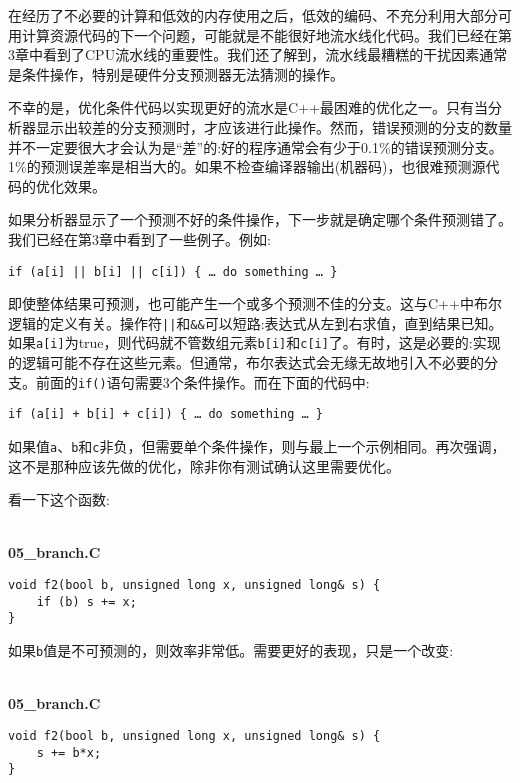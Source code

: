 在经历了不必要的计算和低效的内存使用之后，低效的编码、不充分利用大部分可用计算资源代码的下一个问题，可能就是不能很好地流水线化代码。我们已经在第3章中看到了CPU流水线的重要性。我们还了解到，流水线最糟糕的干扰因素通常是条件操作，特别是硬件分支预测器无法猜测的操作。 

不幸的是，优化条件代码以实现更好的流水是C++最困难的优化之一。只有当分析器显示出较差的分支预测时，才应该进行此操作。然而，错误预测的分支的数量并不一定要很大才会认为是“差”的:好的程序通常会有少于0.1\%的错误预测分支。1\%的预测误差率是相当大的。如果不检查编译器输出(机器码)，也很难预测源代码的优化效果。

如果分析器显示了一个预测不好的条件操作，下一步就是确定哪个条件预测错了。我们已经在第3章中看到了一些例子。例如:

\begin{lstlisting}[style=styleCXX]
if (a[i] || b[i] || c[i]) { … do something … }
\end{lstlisting}

即使整体结果可预测，也可能产生一个或多个预测不佳的分支。这与C++中布尔逻辑的定义有关。操作符\texttt{||}和\texttt{\&\&}可以短路:表达式从左到右求值，直到结果已知。如果\texttt{a[i]}为true，则代码就不管数组元素\texttt{b[i]}和\texttt{c[i]}了。有时，这是必要的:实现的逻辑可能不存在这些元素。但通常，布尔表达式会无缘无故地引入不必要的分支。前面的\texttt{if()}语句需要3个条件操作。而在下面的代码中:

\begin{lstlisting}[style=styleCXX]
if (a[i] + b[i] + c[i]) { … do something … }
\end{lstlisting}

如果值\texttt{a}、\texttt{b}和\texttt{c}非负，但需要单个条件操作，则与最上一个示例相同。再次强调，这不是那种应该先做的优化，除非你有测试确认这里需要优化。

看一下这个函数:

\hspace*{\fill} \\ %
\noindent
\textbf{05\_branch.C}
\begin{lstlisting}[style=styleCXX]
void f2(bool b, unsigned long x, unsigned long& s) {
	if (b) s += x;
}
\end{lstlisting}

如果\texttt{b}值是不可预测的，则效率非常低。需要更好的表现，只是一个改变:

\hspace*{\fill} \\ %
\noindent
\textbf{05\_branch.C}
\begin{lstlisting}[style=styleCXX]
void f2(bool b, unsigned long x, unsigned long& s) {
	s += b*x;
}
\end{lstlisting}

